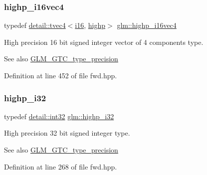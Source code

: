 \subsubsection{\texorpdfstring{highp\+\_\+i16vec4}{highp\_i16vec4}}
{\footnotesize\ttfamily typedef \hyperlink{structglm_1_1detail_1_1tvec4}{detail\+::tvec4}$<$\hyperlink{group__gtc__type__precision_ga35e5542ca05b29cc256fdafb8503d1fd}{i16}, \hyperlink{namespaceglm_a0f04f086094c747d227af4425893f545ac6f7eab42eacbb10d59a58e95e362074}{highp}$>$ \hyperlink{group__gtc__type__precision_ga7fd6f1b3c224833cc330a2c64b6994dd}{glm\+::highp\+\_\+i16vec4}}

High precision 16 bit signed integer vector of 4 components type. \begin{DoxySeeAlso}{See also}
\hyperlink{group__gtc__type__precision}{G\+L\+M\+\_\+\+G\+T\+C\+\_\+type\+\_\+precision} 
\end{DoxySeeAlso}


Definition at line 452 of file fwd.\+hpp.

\mbox{\label{group__gtc__type__precision_ga197d19b585222da57d70238a5cfc2be8}} 
\subsubsection{\texorpdfstring{highp\+\_\+i32}{highp\_i32}}
{\footnotesize\ttfamily typedef \hyperlink{namespaceglm_1_1detail_a9f85b4efeca416cdcec2fd08939a2e17}{detail\+::int32} \hyperlink{group__gtc__type__precision_ga197d19b585222da57d70238a5cfc2be8}{glm\+::highp\+\_\+i32}}

High precision 32 bit signed integer type. \begin{DoxySeeAlso}{See also}
\hyperlink{group__gtc__type__precision}{G\+L\+M\+\_\+\+G\+T\+C\+\_\+type\+\_\+precision} 
\end{DoxySeeAlso}


Definition at line 268 of file fwd.\+hpp.

\mbox{\label{group__gtc__type__precision_gadcd58130a48fa561e784a135a88c5d6e}} 
